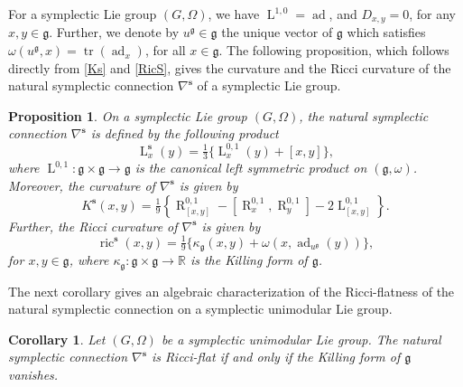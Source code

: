 \documentclass[preprint,12pt,1p]{elsarticle}
\theoremstyle{plain}
\newtheorem{proposition}[theorem]{Proposition}
\newtheorem{corollary}[theorem]{Corollary}
\theoremstyle{definition}
\newcommand{\n}{\nabla}
\newcommand{\ns}{\n^\mathbf{s}}
\newcommand{\tr}{\operatorname{tr}}
\newcommand{\ad}{\operatorname{ad}}
\newcommand{\la}{\operatorname{L}^{0,1}}
\newcommand{\ra}{\operatorname{R}^{0,1}}
\newcommand{\ls}{\operatorname{L}^\mathbf{s}}
\newcommand{\lm}{\operatorname{L}^{1,0}}
\newcommand{\ric}{\operatorname{ric}}
\numberwithin{equation}{section}
\newcommand{\Ks}{K^\mathbf{s}}
\begin{document}
For a symplectic Lie group $(G,\Omega)$, we have $\lm=\ad$, and $D_{x,y}=0$, for any $x,y\in\mathfrak{g}$. Further, we denote by $u^\mathfrak{g}\in\mathfrak{g}$ the unique vector of $\mathfrak{g}$ which satisfies $\omega\left(u^\mathfrak{g},x\right)=\tr\left(\ad_x\right)$, for all $x\in\mathfrak{g}$. The following proposition, which follows directly from \eqref{Ks} and \eqref{RicS}, gives the curvature and the Ricci curvature of the natural symplectic connection $\ns$ of a symplectic Lie group.
\begin{proposition}
On a symplectic Lie group $(G,\Omega)$, the natural symplectic connection $\ns$ is defined by the following product
\begin{equation}\label{PrdLiGrp}
\ls_x(y)=\tfrac{1}{3}\Big\{\la_x(y)+[x,y]\Big\},
\end{equation}
where $\la:\mathfrak{g}\times\mathfrak{g}\to\mathfrak{g}$ is the canonical left symmetric product on $(\mathfrak{g},\omega)$. Moreover, the curvature of $\ns$ is given by
\begin{equation}\label{KsLi}
\Ks(x,y)=\tfrac{1}{9}\left\{\ra_{[x,y]}-\left[\ra_x,\ra_y\right]-2\la_{[x,y]}\right\}.
\end{equation}
Further, the Ricci curvature of $\ns$ is given by
\begin{equation}\label{RisLi}
\ric^\mathbf{s}(x,y)=\tfrac{1}{9}\Big\{\kappa_{\mathfrak{g}}\left(x,y\right)+\omega\left(x,\ad_{u^{\mathfrak{g}}}(y)\right)\Big\},
\end{equation}
for $x,y\in\mathfrak{g}$, where $\kappa_\mathfrak{g}:\mathfrak{g}\times\mathfrak{g}\to{\mathbb{R}}$ is the Killing form of $\mathfrak{g}$.
\end{proposition}

The next corollary gives an algebraic characterization of the Ricci-flatness of the natural symplectic connection on a symplectic unimodular Lie group.

\begin{corollary}\label{UniLiGrp}
Let $(G,\Omega)$ be a symplectic unimodular Lie group. The natural symplectic connection $\ns$ is Ricci-flat if and only if the Killing form of $\mathfrak{g}$ vanishes.
\end{corollary}
\end{document}

